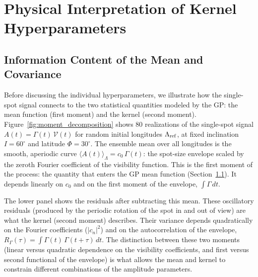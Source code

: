 \documentclass[preprint]{aastex702}
\begin{document}
\vspace{\baselineskip}
\section{Physical Interpretation of Kernel Hyperparameters} \label{sec:hyperparameters}

\subsection{Information Content of the Mean and Covariance} \label{sec:mean_function}
Before discussing the individual hyperparameters, we illustrate how the single-spot signal connects to the two statistical quantities modeled by the GP: the mean function (first moment) and the kernel (second moment). Figure~\ref{fig:moment_decomposition} shows 80 realizations of the single-spot signal $A(t) = \Gamma(t)\,\mathcal{V}(t)$ for random initial longitudes $\Lambda_{\rm ref}$, at fixed inclination $I = 60^\circ$ and latitude $\Phi = 30^\circ$. The ensemble mean over all longitudes is the smooth, aperiodic curve $\langle A(t) \rangle_\Lambda = c_0\,\Gamma(t)$: the spot-size envelope scaled by the zeroth Fourier coefficient of the visibility function. This is the first moment of the process: the quantity that enters the GP mean function (Section~\ref{sec:mean_function}). It depends linearly on $c_0$ and on the first moment of the envelope, $\int \Gamma\,dt$.

The lower panel shows the residuals after subtracting this mean. These oscillatory residuals (produced by the periodic rotation of the spot in and out of view) are what the kernel (second moment) describes. Their variance depends quadratically on the Fourier coefficients ($|c_n|^2$) and on the autocorrelation of the envelope, $R_\Gamma(\tau) = \int \Gamma(t)\,\Gamma(t+\tau)\,dt$. The distinction between these two moments (linear versus quadratic dependence on the visibility coefficients, and first versus second functional of the envelope) is what allows the mean and kernel to constrain different combinations of the amplitude parameters.
\end{document}
